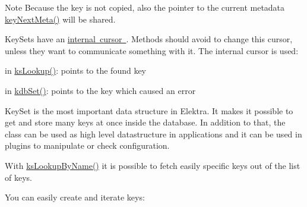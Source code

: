 \begin{DoxyNote}{Note}
Because the key is not copied, also the pointer to the current metadata \mbox{\hyperlink{group__keymeta_ga4c88342f580a4291455a801af71ce048}{key\+Next\+Meta()}} will be shared.
\end{DoxyNote}
Key\+Sets have an \mbox{\hyperlink{group__keyset_ga4287b9416912c5f2ab9c195cb74fb094}{internal cursor }}. Methods should avoid to change this cursor, unless they want to communicate something with it. The internal cursor is used\+:


\begin{DoxyItemize}
\item in \mbox{\hyperlink{group__keyset_gaa34fc43a081e6b01e4120daa6c112004}{ks\+Lookup()}}\+: points to the found key
\item in \mbox{\hyperlink{group__kdb_ga11436b058408f83d303ca5e996832bcf}{kdb\+Set()}}\+: points to the key which caused an error
\end{DoxyItemize}

Key\+Set is the most important data structure in Elektra. It makes it possible to get and store many keys at once inside the database. In addition to that, the class can be used as high level datastructure in applications and it can be used in plugins to manipulate or check configuration.

With \mbox{\hyperlink{group__keyset_gad2e30fb6d4739d917c5abb2ac2f9c1a1}{ks\+Lookup\+By\+Name()}} it is possible to fetch easily specific keys out of the list of keys.

You can easily create and iterate keys\+:


